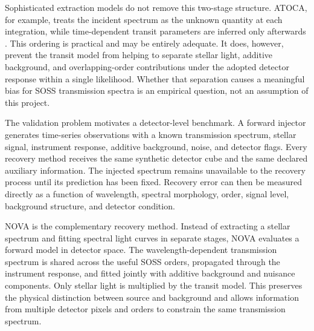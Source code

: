 Sophisticated extraction models do not remove this two-stage structure.
ATOCA, for example, treats the incident spectrum as the unknown quantity at
each integration, while time-dependent transit parameters are inferred only
afterwards
\citep{DarveauBernierEtAl2022,BellEtAl2022,RadicaEtAl2023}. This ordering is
practical and may be entirely adequate. It does, however, prevent the transit
model from helping to separate stellar light, additive background, and
overlapping-order contributions under the adopted detector response within a
single likelihood. Whether that separation causes a meaningful bias
for SOSS transmission spectra is an empirical question, not an assumption of
this project.


The validation problem motivates a detector-level benchmark. A forward injector
generates time-series observations with a known transmission spectrum,
stellar signal, instrument response, additive background, noise, and detector
flags. Every recovery method receives the same synthetic detector cube and
the same declared auxiliary information. The injected spectrum remains
unavailable to the recovery process until its prediction has been fixed.
Recovery error can then be measured directly as a function of wavelength,
spectral morphology, order, signal level, background structure, and detector
condition.


NOVA is the complementary recovery method. Instead of extracting a stellar
spectrum and fitting spectral light curves in separate stages, NOVA evaluates a
forward model in detector space. The wavelength-dependent transmission spectrum
is shared across the useful SOSS orders, propagated through the instrument
response, and fitted jointly with additive background and nuisance components.
Only stellar light is multiplied by the transit model. This preserves the
physical distinction between source and background and allows information from
multiple detector pixels and orders to constrain the same transmission
spectrum.

